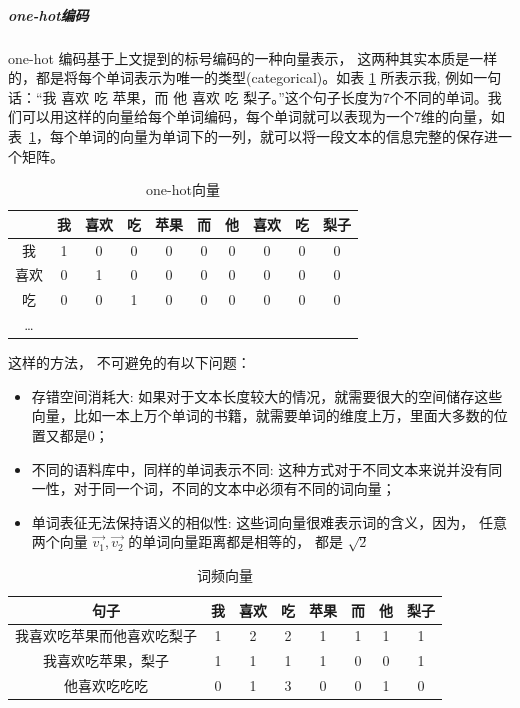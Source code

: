\subparagraph{one-hot编码}
one-hot 编码基于上文提到的标号编码的一种向量表示， 这两种其实本质是一样的，都是将每个单词表示为唯一的类型(categorical)。如表 \ref{table:one-hot} 所表示\cite{athier1997process}我, 例如一句话：“我 喜欢 吃 苹果，而 他 喜欢 吃 梨子。”这个句子长度为7个不同的单词。我们可以用这样的向量给每个单词编码，每个单词就可以表现为一个7维的向量，如表~\ref{table:one-hot}，每个单词的向量为单词下的一列，就可以将一段文本的信息完整的保存进一个矩阵。

\begin{table}[!htbp]
\caption{one-hot向量}
\label{table:one-hot}
\centering
\begin{tabular}{|c|c|c|c|c|c|c|c|c|c|}
\hline
  & 我 & 喜欢 & 吃 & 苹果 & 而 & 他 & 喜欢 & 吃 & 梨子 \\
\hline
我 & 1 & 0 & 0 & 0 & 0 & 0 & 0 & 0 & 0 \\
\hline
喜欢 & 0 & 1 & 0 & 0 & 0 & 0 & 0 & 0 & 0 \\
\hline
吃 & 0 & 0 & 1 & 0 & 0 & 0 & 0 & 0 & 0 \\
\hline
… &  &  &  &  &  &  &  &  &  \\
\hline
\end{tabular}
\end{table}

这样的方法， 不可避免的有以下问题：

\begin{itemize}

\item{存错空间消耗大}: 如果对于文本长度较大的情况，就需要很大的空间储存这些向量，比如一本上万个单词的书籍，就需要单词的维度上万，里面大多数的位置又都是0；
\item{不同的语料库中，同样的单词表示不同}: 这种方式对于不同文本来说并没有同一性，对于同一个词，不同的文本中必须有不同的词向量；
\item{单词表征无法保持语义的相似性}: 这些词向量很难表示词的含义，因为， 任意两个向量 $\vec{v_1},  \vec{v_2}$ 的单词向量距离都是相等的， 都是 $\sqrt{2}$

\end{itemize}

\begin{table}[!htbp]
\caption{词频向量}
\label{table:frequency-vec}
\centering
\begin{tabular}{|c|c|c|c|c|c|c|c|}
\hline
句子 & 我 & 喜欢 & 吃 & 苹果 & 而 & 他 & 梨子 \\
\hline
我喜欢吃苹果而他喜欢吃梨子 & 1 & 2 & 2 & 1 & 1 & 1 & 1 \\
\hline
我喜欢吃苹果，梨子 & 1 & 1 & 1 & 1 & 0 & 0 & 1 \\
\hline
他喜欢吃吃吃 & 0 & 1 & 3 & 0 & 0 & 1 & 0 \\
\hline
\end{tabular}
\end{table}

